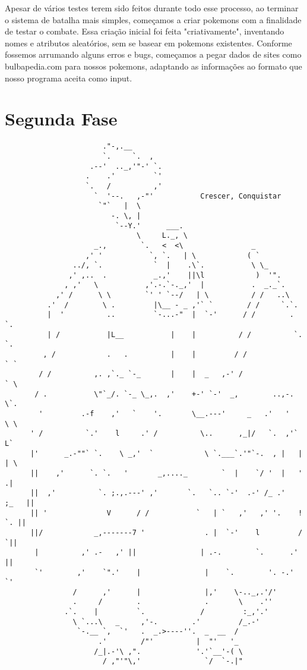 \documentclass[a4paper]{article}
\begin{document}
    Apesar de vários testes terem sido feitos durante todo esse processo, ao terminar o sistema de batalha mais simples, começamos a criar pokemons com a
finalidade de testar o combate. Essa criação inicial foi feita "criativamente",
inventando nomes e atributos aleatórios, sem se basear em pokemons existentes.
Conforme fossemos arrumando alguns erros e bugs, começamos a pegar dados de
sites como bulbapedia.com para nossos pokemons, adaptando as informações ao
formato que nosso programa aceita como input.

\newpage
\section{Segunda Fase}

\begin{verbatim}
                       ."-,.__
                       `.     `.  ,
                    .--'  .._,'"-' `.
                   .    .'         `'
                   `.   /          ,'
                     `  '--.   ,-"'           Crescer, Conquistar
                      `"`   |  \
                         -. \, |
                          `--Y.'      ___.
                               \     L._, \
                     _.,        `.   <  <\                _
                   ,' '           `, `.   | \            ( `
                ../, `.            `  |    .\`.           \ \_
               ,' ,..  .           _.,'    ||\l            )  '".
              , ,'   \           ,'.-.`-._,'  |           .  _._`.
            ,' /      \ \        `' ' `--/   | \          / /   ..\
          .'  /        \ .         |\__ - _ ,'` `        / /     `.`.
          |  '          ..         `-...-"  |  `-'      / /        . `.
          | /           |L__           |    |          / /          `. `.
         , /            .   .          |    |         / /             ` `
        / /          ,. ,`._ `-_       |    |  _   ,-' /               ` \
       / .           \"`_/. `-_ \_,.  ,'    +-' `-'  _,        ..,-.    \`.
        '         .-f    ,'   `    '.       \__.---'     _   .'   '     \ \
      ' /          `.'    l     .' /          \..      ,_|/   `.  ,'`     L`
      |'      _.-""` `.    \ _,'  `            \ `.___`.'"`-.  , |   |    | \
      ||    ,'      `. `.   '       _,...._        `  |    `/ '  |   '     .|
      ||  ,'          `. ;.,.---' ,'       `.   `.. `-'  .-' /_ .'    ;_   ||
      || '              V      / /           `   | `   ,'   ,' '.    !  `. ||
      ||/            _,-------7 '              . |  `-'    l         /    `||
       |          ,' .-   ,' ||               | .-.        `.      .'     ||
       `'        ,'    `".'    |               |    `.        '. -.'       `'
                /      ,'      |               |,'    \-.._,.'/'
                .     /        .               .       \    .''
              .`.    |         `.             /         :_,'.'
                \ `...\   _     ,'-.        .'         /_.-'
                 `-.__ `,  `'   .  _.>----''.  _  __  /
                      .'        /"'          |  "'   '_
                     /_|.-'\ ,".             '.'`__'-( \
                       / ,"'"\,'               `/  `-.|"
\end{verbatim}
\end{document}
